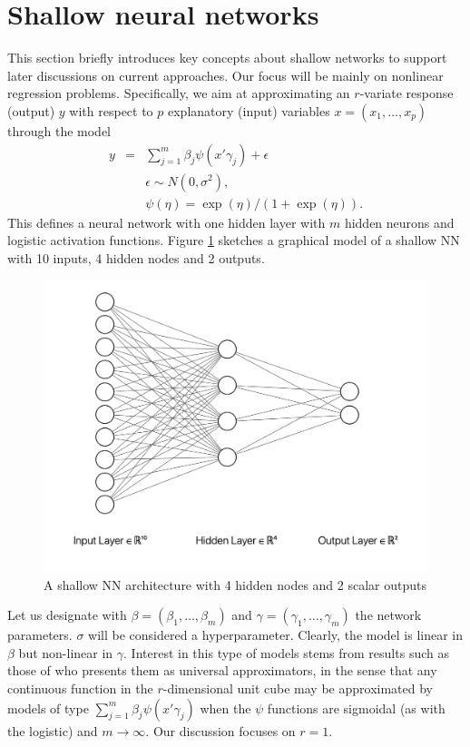 \section{Shallow neural networks}
This section briefly introduces key concepts
about shallow networks to support later discussions on current approaches.
Our focus will be mainly on nonlinear regression 
problems. Specifically, we aim at approximating 
an $r$-variate response (output) $y$ with respect to $p$ explanatory 
(input) variables $x=(x_1,\ldots,x_p)$ through the 
model
\begin{eqnarray}\label{kantora}
  y         & = & \sum_{j=1}^m \beta_j \psi(x' \gamma_j) +
                    \epsilon %
                    \nonumber\\
              & & \epsilon \sim N(0,\sigma^2),
                  \nonumber \\
              & & \psi(\eta) = \exp(\eta)/(1+\exp(\eta)).
                  \end{eqnarray}
This defines a neural network with one hidden 
layer with $m$ hidden neurons and logistic 
activation functions.
Figure \ref{figuradkk1} sketches 
a graphical model of a shallow NN with 10 inputs, 4 hidden nodes and 
2 outputs. 
\begin{figure}
    \centering
    \includegraphics[scale=0.5]{figures/net1.png}
    \caption{A shallow NN architecture with 4 hidden nodes and 2 scalar outputs}
    \label{figuradkk1}
\end{figure}

Let us designate with $\beta=(\beta_1,\ldots,\beta_m)$ and $\gamma=(\gamma_1,\ldots,\gamma_m)$ the network parameters. $\sigma$  
will be considered a hyperparameter. Clearly, the model
is linear in $\beta$ but non-linear in  
$\gamma$. Interest in this type of models stems from 
results such as those of \cite{cybenko1989approximation}
who presents them as universal approximators,
in the sense that any continuous function in the 
$r$-dimensional unit cube 
may be approximated by models of type
$\sum_{j=1}^m \beta_j \psi(x' \gamma_j)$
when the $\psi$
functions are sigmoidal (as with the logistic) and
$m\rightarrow \infty$. Our discussion focuses on $r=1$.



